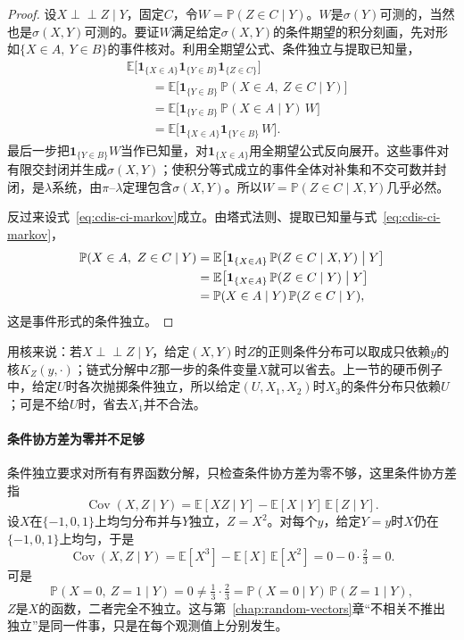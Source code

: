 \begin{proof}
设$X\perp\!\!\!\perp Z\mid Y$，固定$C$，令$W=\mathbb{P}(Z\in C\mid Y)$。$W$是$\sigma(Y)$可测的，当然也是$\sigma(X,Y)$可测的。要证$W$满足给定$\sigma(X,Y)$的条件期望的积分刻画，先对形如$\{X\in A,\ Y\in B\}$的事件核对。利用全期望公式、条件独立与提取已知量，
\[
 \begin{aligned}
 &\mathbb{E}\bigl[\mathbf{1}_{\{X\in A\}}\mathbf{1}_{\{Y\in B\}}\mathbf{1}_{\{Z\in C\}}\bigr]\\
 &\qquad=\mathbb{E}\bigl[\mathbf{1}_{\{Y\in B\}}\,\mathbb{P}(X\in A,\ Z\in C\mid Y)\bigr]\\
 &\qquad=\mathbb{E}\bigl[\mathbf{1}_{\{Y\in B\}}\,\mathbb{P}(X\in A\mid Y)\,W\bigr]\\
 &\qquad=\mathbb{E}\bigl[\mathbf{1}_{\{X\in A\}}\mathbf{1}_{\{Y\in B\}}\,W\bigr].
 \end{aligned}
\]
最后一步把$\mathbf{1}_{\{Y\in B\}}W$当作已知量，对$\mathbf{1}_{\{X\in A\}}$用全期望公式反向展开。这些事件对有限交封闭并生成$\sigma(X,Y)$；使积分等式成立的事件全体对补集和不交可数并封闭，是$\lambda$系统，由$\pi$--$\lambda$定理包含$\sigma(X,Y)$。所以$W=\mathbb{P}(Z\in C\mid X,Y)$几乎必然。

反过来设式~\eqref{eq:cdis-ci-markov}成立。由塔式法则、提取已知量与式~\eqref{eq:cdis-ci-markov}，
\[
 \begin{aligned}
 \mathbb{P}(X\in A,\ Z\in C\mid Y)
 &=\mathbb{E}\bigl[\mathbf{1}_{\{X\in A\}}\,\mathbb{P}(Z\in C\mid X,Y)\bigm|Y\bigr]\\
 &=\mathbb{E}\bigl[\mathbf{1}_{\{X\in A\}}\,\mathbb{P}(Z\in C\mid Y)\bigm|Y\bigr]\\
 &=\mathbb{P}(X\in A\mid Y)\,\mathbb{P}(Z\in C\mid Y),
 \end{aligned}
\]
这是事件形式的条件独立。
\end{proof}

用核来说：若$X\perp\!\!\!\perp Z\mid Y$，给定$(X,Y)$时$Z$的正则条件分布可以取成只依赖$y$的核$K_Z(y,\cdot)$；链式分解中$Z$那一步的条件变量$X$就可以省去。上一节的硬币例子中，给定$U$时各次抛掷条件独立，所以给定$(U,X_1,X_2)$时$X_3$的条件分布只依赖$U$；可是不给$U$时，省去$X_1$并不合法。

\paragraph{条件协方差为零并不足够}
条件独立要求对所有有界函数分解，只检查条件协方差为零不够，这里条件协方差指
\[
 \operatorname{Cov}(X,Z\mid Y)=\mathbb{E}[XZ\mid Y]-\mathbb{E}[X\mid Y]\,\mathbb{E}[Z\mid Y].
\]
设$X$在$\{-1,0,1\}$上均匀分布并与$Y$独立，$Z=X^{2}$。对每个$y$，给定$Y=y$时$X$仍在$\{-1,0,1\}$上均匀，于是
\[
 \operatorname{Cov}(X,Z\mid Y)=\mathbb{E}[X^{3}]-\mathbb{E}[X]\,\mathbb{E}[X^{2}]=0-0\cdot\tfrac23=0 .
\]
可是
\[
 \mathbb{P}(X=0,\ Z=1\mid Y)=0\neq\tfrac13\cdot\tfrac23=\mathbb{P}(X=0\mid Y)\,\mathbb{P}(Z=1\mid Y),
\]
$Z$是$X$的函数，二者完全不独立。这与第~\ref{chap:random-vectors}章“不相关不推出独立”是同一件事，只是在每个观测值上分别发生。

